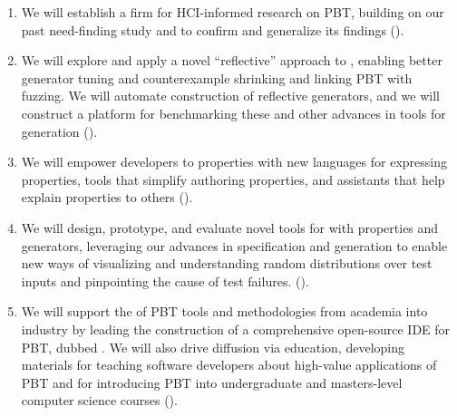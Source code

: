 \begin{enumerate}[noitemsep]
\item We will establish a firm  for HCI-informed research on PBT,
building on our past need-finding study and to confirm and generalize
its findings ().
%
\item We will explore and apply a novel ``reflective'' approach to
, enabling better generator tuning and counterexample
shrinking and linking PBT with fuzzing.  We will automate construction
of reflective generators, and we will construct a platform for
benchmarking these and other advances in tools for generation ().

%
\item We will empower developers to  properties with new
languages for expressing properties, tools that simplify authoring
properties, and assistants that help explain properties to others
().
%
\item We will design, prototype, and evaluate novel tools for
 with properties
and generators, leveraging our advances in specification and generation to
enable new ways of visualizing and understanding random distributions
over test inputs and pinpointing the cause of test failures.
().
%
\item We will support the  of PBT tools and
methodologies from academia into industry by\iflater{}\fi{}
leading the construction of a
comprehensive open-source IDE for PBT, dubbed \tyche.
We will also drive diffusion via education, developing materials for teaching
software developers about high-value applications of PBT and
for introducing PBT into undergraduate and masters-level computer science courses
().
\end{enumerate}
